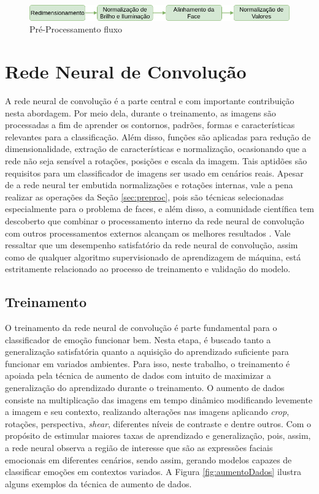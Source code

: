 \begin{figure}
\centering
\includegraphics[scale=0.5]{figuras/PreProcessamentoMestrado.png}
\caption{Pré-Processamento fluxo}
\label{fig:preprocessingfluxo}
\end{figure}



\section{Rede Neural de Convolução}\label{sec:redeneu}
A rede neural de convolução é a parte central e com importante contribuição nesta abordagem. Por meio dela, durante o treinamento, as imagens são processadas a fim de aprender os contornos, padrões, formas e características relevantes para a classificação. Além disso, funções são aplicadas para redução de dimensionalidade, extração de características e normalização, ocasionando que a rede não seja sensível a rotações, posições e escala da imagem. Tais aptidões são requisitos para um classificador de imagens ser usado em cenários reais. Apesar de a rede neural ter embutida normalizações e rotações internas, vale a pena realizar as operações da Seção \ref{sec:preproc}, pois são técnicas selecionadas especialmente para o problema de faces, e além disso, a comunidade científica tem descoberto que combinar o processamento interno da rede neural de convolução com outros processamentos externos alcançam os melhores resultados \citep{art2,art4,art6}. Vale ressaltar que um desempenho satisfatório da rede neural de convolução, assim como de qualquer algoritmo supervisionado de aprendizagem de máquina, está estritamente relacionado ao processo de treinamento e validação do modelo.    

\subsection{Treinamento}
O treinamento da rede neural de convolução é parte fundamental para o classificador de emoção funcionar bem. Nesta etapa, é buscado tanto a generalização satisfatória quanto a aquisição do aprendizado suficiente para funcionar em variados ambientes. Para isso, neste trabalho, o treinamento é apoiada pela técnica de aumento de dados com intuito de maximizar a generalização do aprendizado durante o treinamento. O aumento de dados consiste na multiplicação das imagens em tempo dinâmico modificando levemente a imagem e seu contexto, realizando alterações nas imagens aplicando \textit{crop}, rotações, perspectiva, \textit{shear}, diferentes níveis de contraste e dentre outros. Com o propósito de estimular maiores taxas de aprendizado e generalização, pois, assim, a rede neural observa a região de interesse que são as expressões faciais emocionais em diferentes cenários, sendo assim, gerando modelos capazes de classificar emoções em contextos variados. A Figura \ref{fig:aumentoDados} ilustra alguns exemplos da técnica de aumento de dados.


